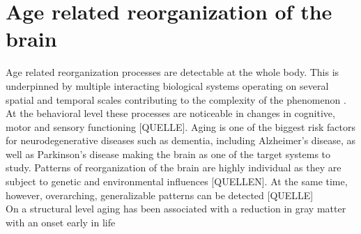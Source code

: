 \section{Age related reorganization of the brain}
Age related reorganization processes are detectable at the whole body. This is underpinned by multiple interacting biological systems operating on several spatial and temporal scales contributing to the complexity of the phenomenon \cite{Mooney2016}. At the behavioral level these processes are noticeable in changes in cognitive, motor and sensory functioning [QUELLE]. Aging is one of the biggest risk factors for neurodegenerative diseases such as dementia, including Alzheimer's disease, as well as Parkinson's disease making the brain as one of the target systems to study. Patterns of reorganization of the brain are highly individual as they are subject to genetic and environmental influences [QUELLEN]. At the same time, however, overarching, generalizable patterns can be detected [QUELLE]\\
On a structural level aging has been associated with a reduction in gray matter with an onset early in life 


\section{}

